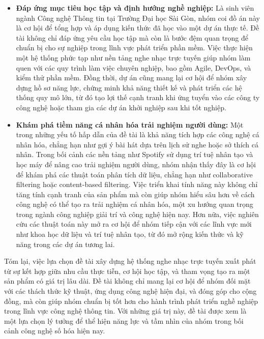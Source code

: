 \documentclass[a4paper,12pt]{report}
\begin{document}
\begin{itemize}
    \item \textbf{Đáp ứng mục tiêu học tập và định hướng nghề nghiệp:}
    Là sinh viên ngành Công nghệ Thông tin tại Trường Đại học Sài Gòn, nhóm coi đồ án này là cơ hội để tổng hợp và áp dụng kiến thức đã học vào một dự án thực tế. Đề tài không chỉ đáp ứng yêu cầu học tập mà còn là bước đệm quan trọng để chuẩn bị cho sự nghiệp trong lĩnh vực phát triển phần mềm. Việc thực hiện một hệ thống phức tạp như nền tảng nghe nhạc trực tuyến giúp nhóm làm quen với các quy trình làm việc chuyên nghiệp, bao gồm Agile, DevOps, và kiểm thử phần mềm. Đồng thời, dự án cũng mang lại cơ hội để nhóm xây dựng hồ sơ năng lực, chứng minh khả năng thiết kế và phát triển các hệ thống quy mô lớn, từ đó tạo lợi thế cạnh tranh khi ứng tuyển vào các công ty công nghệ hoặc tham gia các dự án khởi nghiệp sau khi tốt nghiệp.

    \item \textbf{Khám phá tiềm năng cá nhân hóa trải nghiệm người dùng:}
    Một trong những yếu tố hấp dẫn của đề tài là khả năng tích hợp các công nghệ cá nhân hóa, chẳng hạn như gợi ý bài hát dựa trên lịch sử nghe hoặc sở thích cá nhân. Trong bối cảnh các nền tảng như Spotify sử dụng trí tuệ nhân tạo và học máy để nâng cao trải nghiệm người dùng, nhóm nhận thấy đây là cơ hội để khám phá các thuật toán phân tích dữ liệu, chẳng hạn như collaborative filtering hoặc content-based filtering. Việc triển khai tính năng này không chỉ tăng tính cạnh tranh của sản phẩm mà còn giúp nhóm hiểu sâu hơn về cách công nghệ có thể tạo ra trải nghiệm cá nhân hóa, một xu hướng quan trọng trong ngành công nghiệp giải trí và công nghệ hiện nay. Hơn nữa, việc nghiên cứu các thuật toán này mở ra cơ hội để nhóm tiếp cận với các lĩnh vực mới như khoa học dữ liệu và trí tuệ nhân tạo, từ đó mở rộng kiến thức và kỹ năng trong các dự án tương lai.

\end{itemize}

Tóm lại, việc lựa chọn đề tài xây dựng hệ thống nghe nhạc trực tuyến xuất phát từ sự kết hợp giữa nhu cầu thực tiễn, cơ hội học tập, và tham vọng tạo ra một sản phẩm có giá trị lâu dài. Đề tài không chỉ mang lại cơ hội để nhóm đối mặt với các thách thức kỹ thuật, ứng dụng công nghệ hiện đại, và đóng góp cho cộng đồng, mà còn giúp nhóm chuẩn bị tốt hơn cho hành trình phát triển nghề nghiệp trong lĩnh vực công nghệ thông tin. Với những giá trị này, đề tài được xem là một lựa chọn lý tưởng để thể hiện năng lực và tầm nhìn của nhóm trong bối cảnh công nghệ số hóa hiện nay.
\end{document}

